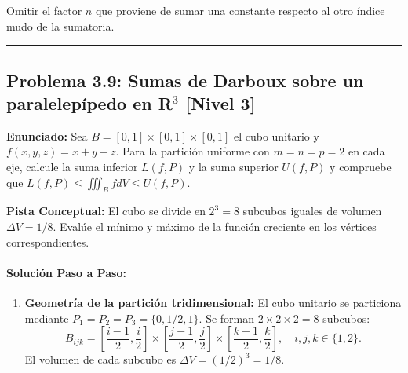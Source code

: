 \documentclass[11pt,a4paper]{article}
\begin{document}
\begin{trapbox}
Omitir el factor $n$ que proviene de sumar una constante respecto al otro índice mudo de la sumatoria.
\end{trapbox}

\vspace{0.5cm}
\hrule
\vspace{0.5cm}

\subsection*{Problema 3.9: Sumas de Darboux sobre un paralelepípedo en R$^3$ \hfill \color{primaryblue}\small[Nivel 3]}

\begin{tcolorbox}[colback=white,colframe=gray!40,arc=1mm,boxrule=0.5pt,left=3mm,right=3mm,top=2mm,bottom=2mm]
\textbf{Enunciado:} Sea $B = [0, 1] \times [0, 1] \times [0, 1]$ el cubo unitario y $f(x,y,z) = x + y + z$. Para la partición uniforme con $m = n = p = 2$ en cada eje, calcule la suma inferior $L(f, P)$ y la suma superior $U(f, P)$ y compruebe que $L(f,P) \le \iiint_B f dV \le U(f,P)$.
\end{tcolorbox}

\begin{tcolorbox}[colback=yellow!4,colframe=accentamber!70,arc=1mm,boxrule=0.5pt,left=3mm,right=3mm,top=1.5mm,bottom=1.5mm]
\textbf{Pista Conceptual:} El cubo se divide en $2^3 = 8$ subcubos iguales de volumen $\Delta V = 1/8$. Evalúe el mínimo y máximo de la función creciente en los vértices correspondientes.
\end{tcolorbox}

\paragraph{Solución Paso a Paso:}\par
\begin{enumerate}[label=\textbf{\arabic*.}]
\item \textbf{Geometría de la partición tridimensional:}
El cubo unitario se particiona mediante $P_1 = P_2 = P_3 = \{0, 1/2, 1\}$.
Se forman $2 \times 2 \times 2 = 8$ subcubos:
\begin{equation*}
B_{ijk} = \left[\frac{i-1}{2}, \frac{i}{2}\right] \times \left[\frac{j-1}{2}, \frac{j}{2}\right] \times \left[\frac{k-1}{2}, \frac{k}{2}\right], \quad i,j,k \in \{1, 2\}.
\end{equation*}
El volumen de cada subcubo es $\Delta V = (1/2)^3 = 1/8$.
\end{enumerate}
\end{document}
